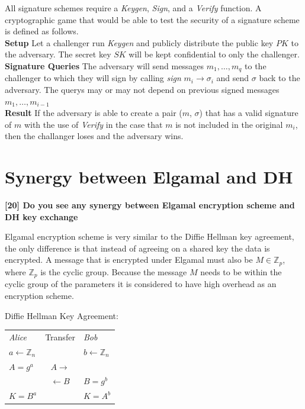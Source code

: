 \documentclass[letterpaper,11pt,notitlepage,fleqn]{article}
\begin{document}
All signature schemes require a \textit{Keygen}, \textit{Sign}, and a \textit{Verify} function. A cryptographic game that would be able to test the security of a signature scheme is defined as follows.\\
\textbf{Setup} Let a challenger run \textit{Keygen} and publicly distribute the public key $PK$ to the adversary. The secret key $SK$ will be kept confidential to only the challenger. \\
\textbf{Signature Queries} The adversary will send messages $m_{1}, \dots, m_{q}$ to the challenger to which they will sign by calling \textit{sign} $m_{i} \rightarrow \sigma_{i}$ and send $\sigma$ back to the adversary. The querys may or may not depend on previous signed messages $m_{1}, \dots, m_{i-1}$ \\
\textbf{Result} If the adversary is able to create a pair ($m$, $\sigma$) that has a valid signature of $m$ with the use of \textit{Verify} in the case that $m$ is not included in the original $m_{i}$, then the challanger loses and the adversary wins. 

\section{Synergy between Elgamal and DH}
\noindent \textbf{[20] Do you see any synergy between Elgamal encryption scheme and DH key exchange}

Elgamal encryption scheme is very similar to the Diffie Hellman key agreement, the only difference is that instead of agreeing on a shared key the data is encrypted. A message that is encrypted under Elgamal must also be $M \in \mathbb{Z}_{p}$, where $\mathbb{Z}_{p}$ is the cyclic group. Because the message $M$ needs to be within the cyclic group of the parameters it is considered to have high overhead as an encryption scheme. 

\noindent Diffie Hellman Key Agreement: \\
\begin{tabular}{l c l}
    \textit{Alice} & Transfer & \textit{Bob} \\
    $a \leftarrow \mathbb{Z}_{n}$ & & $b \leftarrow \mathbb{Z}_{n}$ \\ 
    $A = g^a$ & $A \rightarrow$ & \\
    & $\leftarrow B$ & $ B = g^b $ \\
    $K = B^{a}$ & & $K = A^{b}$ \\
\end{tabular}
\end{document}
